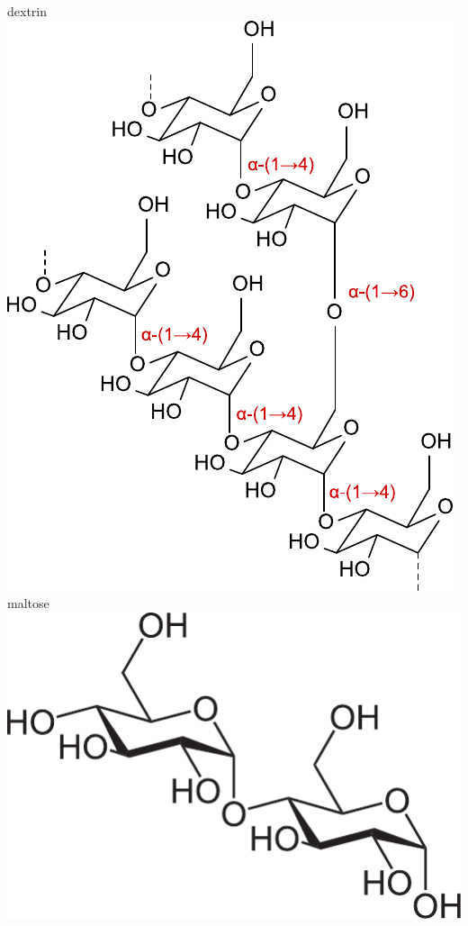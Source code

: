 \documentclass{beamer}
\begin{document}
\begin{frame}
\begin{overprint}
    \centering dextrin\includegraphics[height=0.8\textheight]{dextrin.pdf}\\
    \centering maltose\includegraphics[height=0.4\textheight]{maltose.pdf}\\
  \end{overprint}
\end{frame}
\end{document}

